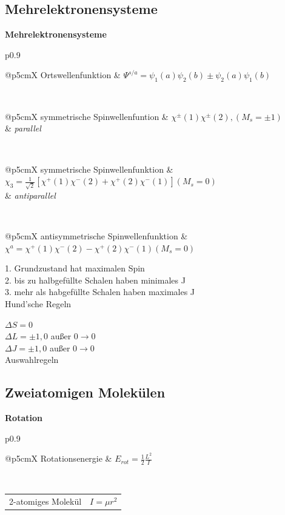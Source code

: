 \documentclass[12pt,a4paper, twoside]{article}
\makeatletter
\renewcommand{\=}[1]{\stackrel{#1}{=}}
\theoremstyle{definition}
\theoremstyle{remark}
\newcommand{\concept}[2]{%
\noindent
\begin{framed}
\noindent\textbf{#1}
\par\begin{tabular}{p{0.9\linewidth}}
#2
\end{tabular}
\end{framed}
}
\newcommand{\fnote}[3]{%
\noindent\begin{tabularx}{\linewidth}{@{}p{5cm}X}
#1 & $#2$\\
& \textit{\small{#3}}
\end{tabularx}}
\newcommand{\f}[2]{%
\noindent\begin{tabularx}{\linewidth}{@{}p{5cm}X}
#1 & $#2$
\end{tabularx}}
\makeatother
\begin{document}
\subsection{Mehrelektronensysteme}

\concept{Mehrelektronensysteme}{
\f{Ortswellenfunktion}{\Psi^{s/a} = \psi_1 (a) \psi_2(b) \pm \psi_2(a) \psi_1(b)}\\
\fnote{symmetrische Spinwellenfuntion}{\chi^{\pm}(1) \chi^{\pm}(2), (M_s = \pm 1)}{parallel}\\
\fnote{symmetrische Spinwellenfunktion}{\chi_3 = \frac{1}{\sqrt{2}} [\chi^+ (1) \chi^- (2) + \chi^+ (2) \chi^- (1)] (M_s = 0)}{antiparallel}\\
\f{antisymmetrische Spinwellenfunktion}{\chi^a = \chi^+ (1) \chi^- (2) - \chi^+ (2) \chi^- (1) (M_s = 0)}

}

\begin{center}
\begin{framed}
	1. Grundzustand hat maximalen Spin\\
	2. bis zu halbgefüllte Schalen haben minimales J\\
	3. mehr als habgefüllte Schalen haben maximales J\\
Hund'sche Regeln
\end{framed}
\end{center}

\begin{center}
\begin{framed}
	$\Delta S = 0$\\
	$\Delta L = \pm 1, 0$ außer $0 \rightarrow 0$\\
	$\Delta J = \pm 1, 0$ außer $0 \rightarrow 0$\\
Auswahlregeln
\end{framed}
\end{center}

\subsection{Zweiatomigen Molekülen}

\concept{Rotation}{
\f{Rotationsenergie}{E_{rot} = \frac{1}{2} \frac{L^2}{I}}\\
\f{2-atomiges Molekül}{I = \mu r^2}
}
\end{document}
